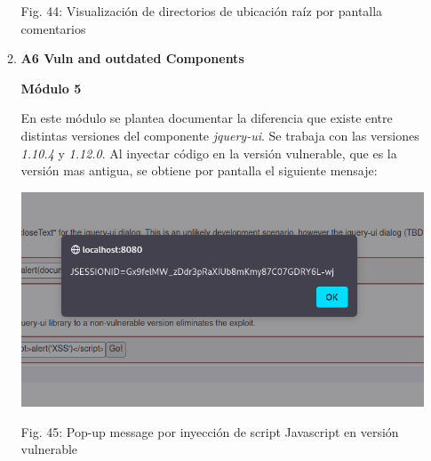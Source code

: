 \documentclass[12pt,oneside,a4paper]{book}
\begin{document}
\begin{enumerate}
\begin{enumerate}
\begin{center}
            \vspace{0.1em}
            
            Fig. 44: Visualización de directorios de ubicación raíz por pantalla comentarios
        \end{center}
        
        \vspace{2em}





        \item{\textbf{A6 Vuln and outdated Components}}

        \vspace{1em}

        \textbf{Módulo 5} 
        
        \vspace{1em}
        
        \hspace{20pt}
        En este módulo se plantea documentar la diferencia que existe entre distintas versiones del componente \textit{jquery-ui}. Se trabaja con las versiones \textit{1.10.4} y \textit{1.12.0}. Al inyectar código en la versión vulnerable, que es la versión mas antigua, se obtiene por pantalla el siguiente mensaje:
        
        \vspace{2em}

        \begin{center}
            \includegraphics[width=12cm]{img/A6-2.png}
            
            \vspace{0.1em}
            
            Fig. 45: Pop-up message por inyección de script Javascript en versión vulnerable
        \end{center}


\end{enumerate}
\end{enumerate}
\end{document}
